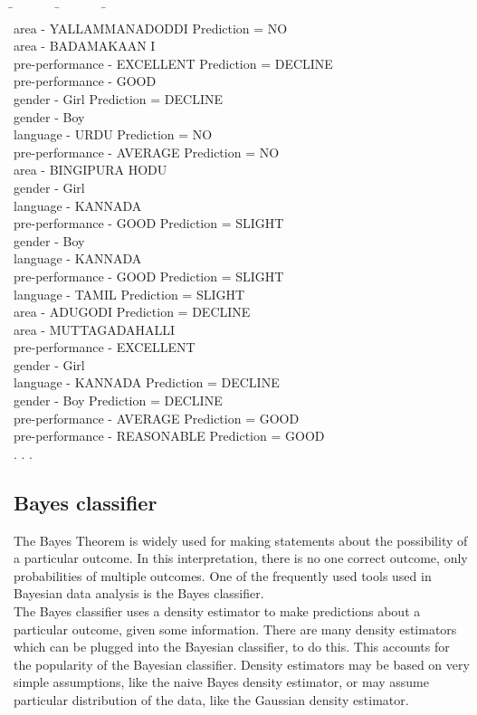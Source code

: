 \documentclass[10pt]{article}
\begin{document}
\begin{tabbing}
\label{DecisionTreeFragment}
 \= ~~~~~~ \= ~~~~~~ \= ~~~~~ \= \\
\> area - YALLAMMANADODDI Prediction = NO \\
\> area - BADAMAKAAN I  \\
\> \> pre-performance - EXCELLENT Prediction = DECLINE \\
\> \> pre-performance - GOOD  \\
\> \> \> gender - Girl Prediction = DECLINE \\
\> \> \> gender - Boy  \\
\> \> \> \> language - URDU Prediction = NO \\
\> \> pre-performance - AVERAGE Prediction = NO \\
\> area - BINGIPURA HODU  \\
\> \> gender - Girl  \\
\> \> \> language - KANNADA  \\
\> \> \> \> pre-performance - GOOD Prediction = SLIGHT \\
\> \> gender - Boy  \\
\> \> \> language - KANNADA  \\
\> \> \> \> pre-performance - GOOD Prediction = SLIGHT \\
\> \> \> language - TAMIL Prediction = SLIGHT \\
\> area - ADUGODI Prediction = DECLINE \\
\> area - MUTTAGADAHALLI  \\
\> \> pre-performance - EXCELLENT  \\
\> \> \> gender - Girl  \\
\> \> \> \> language - KANNADA Prediction = DECLINE \\
\> \> \> gender - Boy Prediction = DECLINE \\
\> \> pre-performance - AVERAGE Prediction = GOOD \\
\> \> pre-performance - REASONABLE Prediction = GOOD \\
. . .
\end{tabbing}

\subsection{Bayes classifier}
The Bayes Theorem is widely used for making statements about the possibility of a particular outcome. In this interpretation, there is no one correct outcome, only probabilities of multiple outcomes. One of the frequently used tools used in Bayesian data analysis is the Bayes classifier.\\
The Bayes classifier uses a density estimator to make predictions about a particular outcome, given some information. There are many density estimators which can be plugged into the Bayesian classifier, to do this. This accounts for the popularity of the Bayesian classifier. Density estimators may be based on very simple assumptions, like the naive Bayes density estimator, or may assume particular distribution of the data, like the Gaussian density estimator.\\
\end{document}
